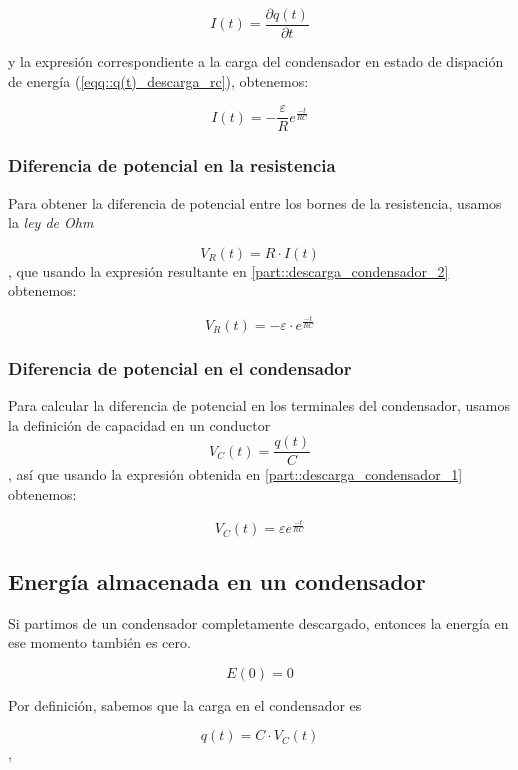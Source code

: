\documentclass[../main.tex]{subfiles}
\begin{document}
$$I(t) = \frac{\partial q(t)}{\partial t}$$

y la expresión correspondiente a la carga del condensador en estado de dispación de energía (\ref{eqq::q(t)_descarga_rc}), obtenemos:

\begin{equation}
    I(t) = -\frac{\varepsilon}{R} e^{\frac{-t}{RC}} 
\end{equation}



\subsubsection{Diferencia de potencial en la resistencia}
\label{part::descarga_condensador_3}
Para obtener la diferencia de potencial entre los bornes de la resistencia, usamos la \textit{ley de Ohm}

$$V_R(t) = R \cdot I(t)$$
, que usando la expresión resultante en \ref{part::descarga_condensador_2} obtenemos:

\begin{equation}
    V_R(t) = -\varepsilon \cdot e^{\frac{-t}{RC}}
\end{equation}


\subsubsection{Diferencia de potencial en el condensador}
\label{part::descarga_condensador_4}
Para calcular la diferencia de potencial en los terminales del condensador, usamos la definición de capacidad en un conductor
$$V_C(t) = \frac{q(t)}{C}$$
, así que usando la expresión obtenida en \ref{part::descarga_condensador_1} obtenemos:

\begin{equation}
    V_C(t) = \varepsilon  e^{\frac{-t}{RC}}
\end{equation}



\subsection{Energía almacenada en un condensador}
\label{part::energia_condensador}
Si partimos de un condensador completamente descargado, entonces la energía en ese momento también es cero.

$$E(0) = 0$$

Por definición, sabemos que la carga en el condensador es

$$q(t) = C \cdot V_C(t)$$, 
\end{document}
